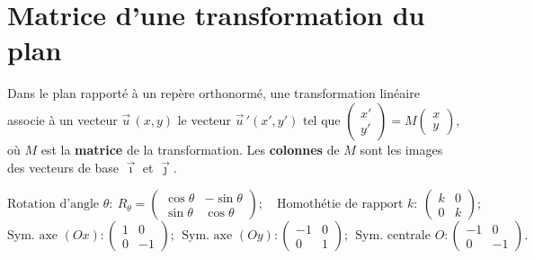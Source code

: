 \section{Matrice d'une transformation du plan}

Dans le plan rapporté à un repère orthonormé, une transformation linéaire associe à un vecteur
$\vec u\,(x,y)$ le vecteur $\vec u\,'(x',y')$ tel que $\begin{pmatrix}x'\\y'\end{pmatrix}
=M\begin{pmatrix}x\\y\end{pmatrix}$, où $M$ est la \textbf{matrice} de la transformation. Les
\textbf{colonnes} de $M$ sont les images des vecteurs de base $\vec\imath$ et $\vec\jmath$.

\begin{propriete}
\[
\text{Rotation d'angle }\theta:\ R_\theta=\begin{pmatrix}\cos\theta&-\sin\theta\\\sin\theta&\cos\theta\end{pmatrix};\quad
\text{Homothétie de rapport }k:\ \begin{pmatrix}k&0\\0&k\end{pmatrix};
\]
\[
\text{Sym. axe }(Ox):\begin{pmatrix}1&0\\0&-1\end{pmatrix};\ \
\text{Sym. axe }(Oy):\begin{pmatrix}-1&0\\0&1\end{pmatrix};\ \
\text{Sym. centrale }O:\begin{pmatrix}-1&0\\0&-1\end{pmatrix}.
\]
\end{propriete}

\begin{illus}
\end{illus}

